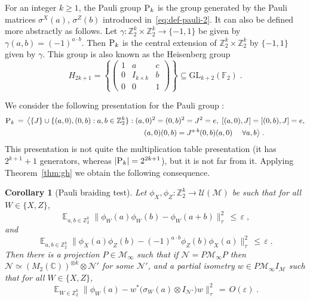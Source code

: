 \documentclass[11pt]{article}
\newtheorem{corollary}[theorem]{Corollary}
\theoremstyle{definition}
\newcommand{\Id}{\ensuremath{I}}
\DeclareMathOperator*{\Expectation}{\mathbb{E}}
\newcommand{\Es}[1]{\Expectation_{#1}}
\newcommand{\C}{\ensuremath{\mathbb{C}}}
\newcommand{\F}{\ensuremath{\mathbb{F}}}
\newcommand{\Z}{\ensuremath{\mathbb{Z}}}
\newcommand{\mM}{\ensuremath{\mathcal{M}}}
\newcommand{\mU}{\ensuremath{\mathcal{U}}}
\newcommand{\eps}{\varepsilon}
\newcommand{\mN}{\mathcal{N}}
\newcommand{\gamestyle}[1]{\ensuremath{\textsc{#1}}\xspace}
\newcommand{\pauli}{\gamestyle{P}}
\begin{document}
For an integer $k\geq 1$,  the Pauli group $\pauli_k$ is the group generated by the Pauli matrices $\sigma^X(a)$, $\sigma^Z(b)$ introduced in~\eqref{eq:def-pauli-2}. It can also be defined more abstractly as follows. Let $\gamma: \Z_2^k\times \Z_2^k \to \{-1,1\}$ be given by $\gamma(a,b)=(-1)^{a\cdot b}$. Then $\pauli_k$ is the central extension of $\Z_2^k\times \Z_2^k$ by $\{-1,1\}$ given by $\gamma$. This group 
is also known as the Heisenberg group 
\begin{equation}\label{eq:defn_Pauli_as_Heisenberg} H_{2k+1} = \left \{ \begin{pmatrix} 1 & a & c \\ 0 & I_{k \times k} & b \\ 0 & 0 & 1 \end{pmatrix} \right\}\subseteq {\mathrm{GL}}_{k+2}(\F_2)\;.
\end{equation}
 
We consider the following presentation for the Pauli group :
\begin{align*}
 \pauli_k \,=\, \big\langle \{J\}\cup  \{(a,0),(0,b): a,b\in \Z_2^k\} &: (a,0)^2=(0,b)^2=J^2=e,\; [(a,0),J]=[(0,b),J]=e,\\
&\qquad  (a,0)(0,b) = J^{a\cdot b} (0,b)(a,0) \; \quad \forall a,b\big\rangle\;.
\end{align*}
This presentation is not quite the multiplication table presentation (it has $2^{k+1}+1$ generators, whereas $|\pauli_k|=2^{2k+1}$), but it is not far from it.  
Applying Theorem~\ref{thm:gh} we obtain the following consequence.%

\begin{corollary}[Pauli braiding test]\label{cor:Pauli-brading_is_stable}
Let $\phi_X,\phi_Z:\Z_2^k \to \mU(\mM)$ be such that for all $W\in \{X,Z\}$,
\[ \Es{a,b\in \Z_2^k} \big\| \phi_W(a)\phi_W(b)-\phi_W(a+b) \big\|_\tau^2 \,\leq\,\eps\;,\]
and
\[ \Es{a,b\in \Z_2^k} \big\| \phi_X(a)\phi_Z(b)- (-1)^{a\cdot b} \phi_Z(b)\phi_X(a) \big\|_{\tau}^2 \,\leq\,\eps\;.\]
Then there is a projection $P\in \mM_\infty$ such that if $\mN=P\mM_\infty P$ then $\mN\simeq (M_2(\C))^{\otimes k} \otimes \mN'$ for some $\mN'$, and a
partial isometry $w\in P\mM_\infty I_\mM$ such that for all $W\in \{X,Z\}$, 
\[ \Es{W\in \Z_2^k} \big\| \phi_W(a) - w^* \big(\sigma_W(a)\otimes \Id_{\mN'}\big) w \big\|_{\tau}^2 \,=\, O(\eps)\;.\]
\end{corollary}
\end{document}
